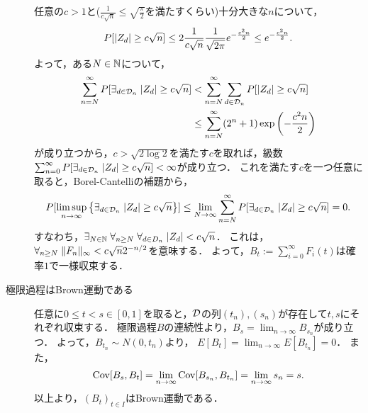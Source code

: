 \documentclass[uplatex,dvipdfmx]{jsreport}
\begin{document}
\begin{construction}
\begin{description}
        任意の$c>1$と($\frac{1}{c\sqrt{n}}\le\sqrt{\frac{\pi}{2}}$を満たすくらい)十分大きな$n$について，
        \[P[\lvert Z_d\rvert\ge c\sqrt{n}]\le2\frac{1}{c\sqrt{n}}\frac{1}{\sqrt{2\pi}}e^{-\frac{c^2n}{2}}\le e^{-\frac{c^2n}{2}}.\]
        よって，ある$N\in\mathbb{N}$について，
        \begin{align*}
            \sum^\infty_{n=N}P[\exists_{d\in\mathcal{D}_n}\;\lvert Z_d\rvert\ge c\sqrt{n}]&<\sum^\infty_{n=N}\sum_{d\in\mathcal{D}_n}P[\lvert Z_d\rvert\ge c\sqrt{n}]\\
            &\le\sum^\infty_{n=N}(2^n+1)\exp\left(-\frac{c^2n}{2}\right)
        \end{align*}
        が成り立つから，$c>\sqrt{2\log 2}$を満たす$c$を取れば，級数$\sum^\infty_{n=0}P[\exists_{d\in\mathcal{D}_n}\;\lvert Z_d\rvert\ge c\sqrt{n}]<\infty$が成り立つ．
        これを満たす$c$を一つ任意に取ると，Borel-Cantelliの補題から，
        \[P[\limsup_{n\to\infty}\left\{\exists_{d\in\mathcal{D}_n}\;\lvert Z_d\rvert\ge c\sqrt{n}\right\}]\le\lim_{N\to\infty}\sum_{n=N}^\infty P[\exists_{d\in\mathcal{D}_n}\;\lvert Z_d\rvert\ge c\sqrt{n}]=0.\]
        すなわち，$\exists_{N\in\mathbb{N}}\;\forall_{n\ge N}\;\forall_{d\in D_n}\;\lvert Z_d\rvert<c\sqrt{n}$．
        これは，$\forall_{n\ge N}\;\|F_n\|_\infty<c\sqrt{n}2^{-n/2}$を意味する．
        よって，$B_t:=\sum^\infty_{i=0}F_i(t)$は確率$1$で一様収束する．
        \item[極限過程はBrown運動である]
        任意に$0\le t<s\in[0,1]$を取ると，$\mathcal{D}$の列$(t_n),(s_n)$が存在して$t,s$にそれぞれ収束する．
        極限過程$B$の連続性より，$B_s=\lim_{n\to\infty}B_{s_n}$が成り立つ．
        よって，$B_{t_n}\sim N(0,t_n)$より，
        $E[B_t]=\lim_{n\to\infty}E[B_{t_n}]=0$．
        また，
        \[\mathrm{Cov}[B_s,B_t]=\lim_{n\to\infty}\mathrm{Cov}[B_{s_n},B_{t_n}]=\lim_{n\to\infty}s_n=s.\]
        以上より，$(B_t)_{t\in I}$はBrown運動である．
    \end{description}
\end{construction}
\end{document}

